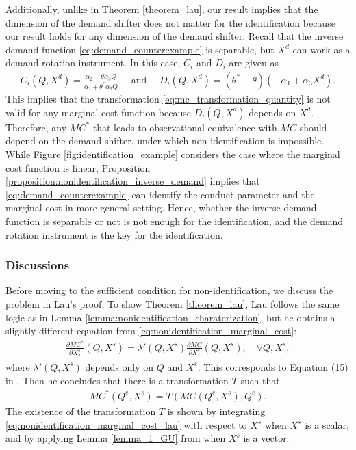 \documentclass[11pt, a4paper]{article}
\theoremstyle{remark}
\begin{document}
Additionally, unlike in Theorem \ref{theorem_lau}, our result implies that the dimension of the demand shifter does not matter for the identification because our result holds for any dimension of the demand shifter.
Recall that the inverse demand function \eqref{eq:demand_counterexample} is separable, but $X^{d}$ can work as a demand rotation instrument.
In this case, $C_i$ and $D_i$ are given as
\begin{align}
    C_i(Q, X^{d}) = \frac{\alpha_2 + \theta\alpha_3Q}{\alpha_2 + \theta^{*}\alpha_3Q}\quad \text{ and }\quad  D_i(Q, X^{d}) =  (\theta^{*} - \theta)(-\alpha_1 + \alpha_3X^{d}).
\end{align}
This implies that the transformation \eqref{eq:mc_transformation_quantity} is not valid for any marginal cost function because $D_i(Q, X^{d})$ depends on $X^{d}$.
Therefore, any $MC^{*}$ that leads to observational equivalence with $MC$ should depend on the demand shifter, under which non-identification is impossible.
While Figure \ref{fig:identification_example} considers the case where the marginal cost function is linear, Proposition \ref{proposition:nonidentification_inverse_demand} implies that \eqref{eq:demand_counterexample} can identify the conduct parameter and the marginal cost in more general setting.
Hence, whether the inverse demand function is separable or not is not enough for the identification, and the demand rotation instrument is the key for the identification.




\subsubsection{Discussions}\label{subsubsec:necessary_condition_discussion}

Before moving to the sufficient condition for non-identification, we discuss the problem in Lau's proof.
To show Theorem \ref{theorem_lau}, Lau follows the same logic as in Lemma \ref{lemma:nonidentification_charaterization}, but he obtains a slightly different equation from \eqref{eq:nonidentification_marginal_cost}:
\begin{align}
    \frac{\partial MC^{*}}{\partial X^{s}_j}(Q, X^{s}) = \lambda'(Q, X^{s}) \frac{\partial MC}{\partial X^{s}_j}(Q, X^{s}),\quad \forall Q, X^{s}, \label{eq:nonidentification_marginal_cost_lau}
\end{align}
where $\lambda'(Q, X^{s})$ depends only on $Q$ and $X^{s}$.
This corresponds to Equation (15) in \citet{lauIdentifying1982}.
Then he concludes that there is a transformation $T$ such that 
\begin{align}
    MC^{*}(Q^e, X^{s}) = T(MC(Q^e, X^{s}), Q^e). \label{eq:mc_transformation_lau}
\end{align}
The existence of the transformation $T$ is shown by integrating \eqref{eq:nonidentification_marginal_cost_lau} with respect to $X^{s}$ when $X^{s}$ is a scalar, and by applying Lemma \ref{lemma_1_GU} from \citet{goldmanNote1964} when $X^{s}$ is a vector.
\end{document}
